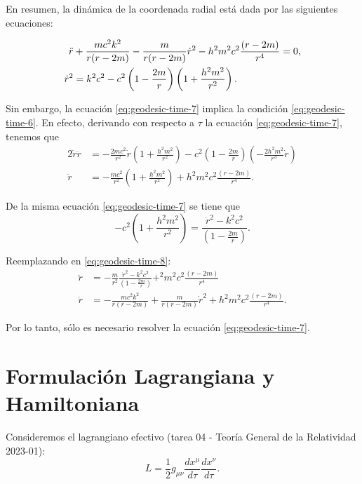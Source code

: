\documentclass[letterpaper,11pt]{article}
\begin{document}
En resumen, la dinámica de la coordenada radial está dada por las siguientes ecuaciones:
\begin{shaded}
\begin{align}
\Ddot{r} &+ \frac{mc^2k^2}{r(r-2m)}  - \frac{m}{r(r-2m)} \dot{r}^2 - h^2m^2c^2 \frac{(r-2m)}{r^4}  = 0, \label{eq:geodesic-time-6} \\
\dot{r}^2 &= k^2c^2 - c^2 \left(1 - \frac{2m}{r} \right)\left(1 + \frac{h^2m^2}{r^2} \right).\label{eq:geodesic-time-7} 
\end{align}
\end{shaded}

Sin embargo, la ecuación \eqref{eq:geodesic-time-7} implica la condición \eqref{eq:geodesic-time-6}. En efecto, derivando con respecto a $\tau$ la ecuación \eqref{eq:geodesic-time-7}, tenemos que
\begin{align}
2 \dot{r} \ddot{r} &= - \frac{2m c^2}{r^2} \dot{r} \left(1 + \frac{h^2m^2}{r^2} \right) - c^2 \left(1 - \frac{2m}{r} \right)\left(- \frac{2h^2m^2}{r^3} \dot{r} \right) \\
\ddot{r} &= - \frac{mc^2}{r^2} \left(1 + \frac{h^2m^2}{r^2} \right) + h^2m^2c^2 \frac{(r-2m)}{r^4}. \label{eq:geodesic-time-8}
\end{align}

De la misma ecuación \eqref{eq:geodesic-time-7} se tiene que
\begin{equation}
- c^2 \left( 1 + \frac{h^2m^2}{r^2}\right) = \frac{\dot{r}^2 - k^2c^2}{\left( 1 - \frac{2m}{r}\right)}.
\end{equation}

Reemplazando en \eqref{eq:geodesic-time-8}:
\begin{align}
\ddot{r} &= - \frac{m}{r^2} \frac{\dot{r}^2 - k^2c^2}{\left(1 - \frac{2m}{r} \right)} + ^2m^2c^2 \frac{(r-2m)}{r^4} \\
\ddot{r} &= - \frac{mc^2k^2}{r(r-2m)} + \frac{m}{r(r-2m)} \dot{r}^2 + h^2m^2c^2 \frac{(r-2m)}{r^4}.
\end{align}

Por lo tanto, sólo es necesario resolver la ecuación \eqref{eq:geodesic-time-7}.

\section{Formulación Lagrangiana y Hamiltoniana}


Consideremos el lagrangiano efectivo (tarea 04 - Teoría General de la Relatividad 2023-01):
\begin{equation}
L = \frac{1}{2} g_{\mu\nu} \frac{dx^{\mu}}{d\tau}\frac{dx^{\nu}}{d\tau}.
\end{equation}
\end{document}
